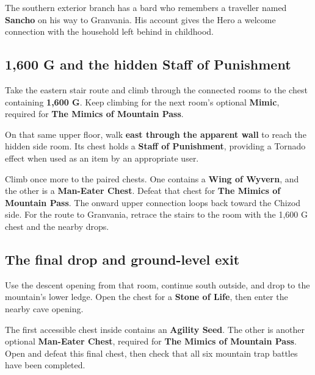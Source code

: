 The southern exterior branch has a bard who remembers a traveller
named \textbf{Sancho} on his way to Granvania. His account gives
the Hero a welcome connection with the household left behind in
childhood.

\subsection*{1,600 G and the hidden Staff of Punishment}

Take the eastern stair route and climb through the connected rooms
to the chest containing \textbf{1,600 G}. Keep climbing for the
next room's optional \textbf{Mimic}, required for
\textbf{The Mimics of Mountain Pass}.

On that same upper floor, walk \textbf{east through the apparent
wall} to reach the hidden side room. Its chest holds a
\textbf{Staff of Punishment}, providing a Tornado effect when
used as an item by an appropriate user.


Climb once more to the paired chests. One contains a
\textbf{Wing of Wyvern}, and the other is a
\textbf{Man-Eater Chest}. Defeat that chest for
\textbf{The Mimics of Mountain Pass}. The onward upper connection loops back
toward the Chizod side. For the route to Granvania, retrace the
stairs to the room with the 1,600 G chest and the nearby drops.

\subsection*{The final drop and ground-level exit}

Use the descent opening from that room, continue south outside,
and drop to the mountain's lower ledge. Open the chest for a
\textbf{Stone of Life}, then enter the nearby cave opening.

The first accessible chest inside contains an \textbf{Agility Seed}.
The other is another optional \textbf{Man-Eater Chest}, required for
\textbf{The Mimics of Mountain Pass}. Open and defeat this final chest,
then check that all six mountain trap battles have been completed.



